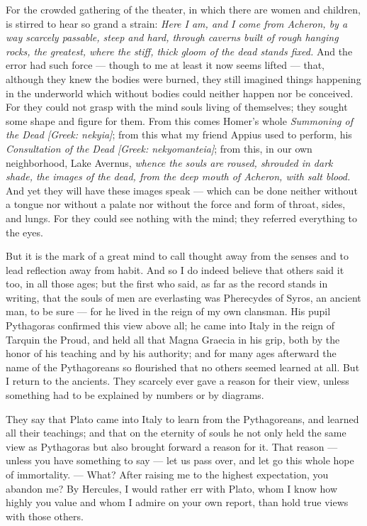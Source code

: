  For the crowded gathering of the theater, in which there are women and children, is stirred to hear so grand a strain: \textit{Here I am, and I come from Acheron, by a way scarcely passable, steep and hard, through caverns built of rough hanging rocks, the greatest, where the stiff, thick gloom of the dead stands fixed.} And the error had such force — though to me at least it now seems lifted — that, although they knew the bodies were burned, they still imagined things happening in the underworld which without bodies could neither happen nor be conceived. For they could not grasp with the mind souls living of themselves; they sought some shape and figure for them. From this comes Homer's whole \textit{Summoning of the Dead [Greek: nekyia]}; from this what my friend Appius used to perform, his \textit{Consultation of the Dead [Greek: nekyomanteia]}; from this, in our own neighborhood, Lake Avernus, \textit{whence the souls are roused, shrouded in dark shade, the images of the dead, from the deep mouth of Acheron, with salt blood.} And yet they will have these images speak — which can be done neither without a tongue nor without a palate nor without the force and form of throat, sides, and lungs. For they could see nothing with the mind; they referred everything to the eyes.

 But it is the mark of a great mind to call thought away from the senses and to lead reflection away from habit. And so I do indeed believe that others said it too, in all those ages; but the first who said, as far as the record stands in writing, that the souls of men are everlasting was Pherecydes of Syros, an ancient man, to be sure — for he lived in the reign of my own clansman. His pupil Pythagoras confirmed this view above all; he came into Italy in the reign of Tarquin the Proud, and held all that Magna Graecia in his grip, both by the honor of his teaching and by his authority; and for many ages afterward the name of the Pythagoreans so flourished that no others seemed learned at all. But I return to the ancients. They scarcely ever gave a reason for their view, unless something had to be explained by numbers or by diagrams.

 They say that Plato came into Italy to learn from the Pythagoreans, and learned all their teachings; and that on the eternity of souls he not only held the same view as Pythagoras but also brought forward a reason for it. That reason — unless you have something to say — let us pass over, and let go this whole hope of immortality. — What? After raising me to the highest expectation, you abandon me? By Hercules, I would rather err with Plato, whom I know how highly you value and whom I admire on your own report, than hold true views with those others.

